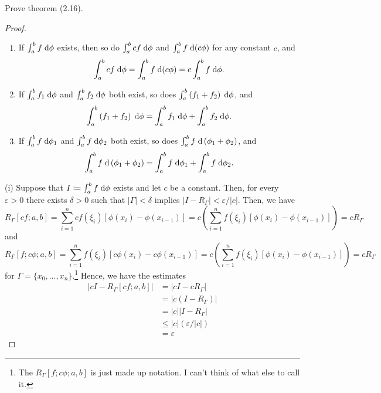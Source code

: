 \begin{problem}
Prove theorem (2.16).
\end{problem}
\begin{proof}
\begin{theorem*}
\begin{enumerate}[label=(\roman*)]
\item If $\int_a^b f\;\mathrm{d}\phi$ exists, then so do $\int_a^bcf\;\mathrm{d}\phi$ and
  $\int_a^b f\;\mathrm{d}(c\phi)$ for any constant $c$, and
\[
\int_a^bcf\;\mathrm{d}\phi=\int_a^bf\;\mathrm{d}(c\phi)=c\int_a^bf\;\mathrm{d}\phi.
\]
\item If $\int_a^b f_1\;\mathrm{d}\phi$ and $\int_a^bf_2\;\mathrm{d}\phi$ both exist, so
  does $\int_a^b\left(f_1+f_2\right)\;\mathrm{d}\phi$, and
\[
\int_a^b\left(f_1+f_2\right)\;\mathrm{d}\phi=\int_a^bf_1\;\mathrm{d}\phi+\int_a^bf_2\;\mathrm{d}\phi.
\]
\item If $\int_a^bf\;\mathrm{d}\phi_1$ and $\int_a^bf\;\mathrm{d}\phi_2$ both exist, so
  does $\int_a^bf\;\mathrm{d}\left(\phi_1+\phi_2\right)$, and
\[
\int_a^bf\;\mathrm{d}\left(\phi_1+\phi_2\right)=\int_a^bf\;\mathrm{d}\phi_1+\int_a^bf\;\mathrm{d}\phi_2.
\]
\end{enumerate}
\end{theorem*}
(i) Suppose that $I\coloneqq \int_a^b f\;\mathrm{d}\phi$ exists and let $c$ be a
constant. Then, for every $\varepsilon>0$ there exists $\delta>0$ such that
$|\Gamma|<\delta$ implies $|I-R_\Gamma|<\varepsilon/|c|$. Then, we have
\begin{equation}
\label{eq:4}
R_\Gamma[cf;a,b]=\sum_{i=1}^n cf(\xi_i)\left[\phi(x_i)-\phi(x_{i-1})\right]
=c\left(\sum_{i=1}^nf(\xi_i)\left[\phi(x_i)-\phi(x_{i-1})\right]\right)
=cR_\Gamma
\end{equation}
and
\begin{equation}
\label{eq:5}
R_\Gamma[f;c\phi;a,b]=\sum_{i=1}^n
f(\xi_i)\left[c\phi(x_i)-c\phi(x_{i-1})\right]
=c\left(\sum_{i=1}^nf(\xi_i)\left[\phi(x_i)-\phi(x_{i-1})\right]\right)
=cR_\Gamma
\end{equation}
for $\Gamma=\{x_0,...,x_n\}$.\footnote{The $R_\Gamma[f;c\phi;a,b]$ is just
made up notation. I can't think of what else to call it.} Hence, we have
the estimates
\begin{align*}
\left|cI-R_\Gamma[cf;a,b]\right|
&=\left|cI-cR_\Gamma\right|\\
&=\left|c(I-R_\Gamma)\right|\\
&=|c||I-R_\Gamma|\\
&\leq |c|\left(\varepsilon/|c|\right)\\
&=\varepsilon
\end{align*}

\end{proof}
